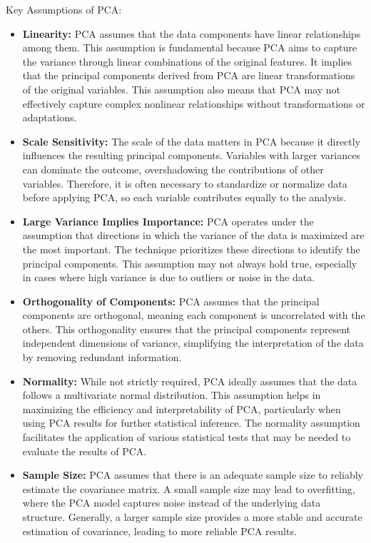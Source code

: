 \documentclass[sigconf]{acmart}
\begin{document}
Key Assumptions of PCA:

\begin{itemize}
    \item \textbf{Linearity:} PCA assumes that the data components have linear relationships among them. This assumption is fundamental because PCA aims to capture the variance through linear combinations of the original features. It implies that the principal components derived from PCA are linear transformations of the original variables. This assumption also means that PCA may not effectively capture complex nonlinear relationships without transformations or adaptations.
    
    \item \textbf{Scale Sensitivity:} The scale of the data matters in PCA because it directly influences the resulting principal components. Variables with larger variances can dominate the outcome, overshadowing the contributions of other variables. Therefore, it is often necessary to standardize or normalize data before applying PCA, so each variable contributes equally to the analysis.
    
    \item \textbf{Large Variance Implies Importance:} PCA operates under the assumption that directions in which the variance of the data is maximized are the most important. The technique prioritizes these directions to identify the principal components. This assumption may not always hold true, especially in cases where high variance is due to outliers or noise in the data.
    
    \item \textbf{Orthogonality of Components:} PCA assumes that the principal components are orthogonal, meaning each component is uncorrelated with the others. This orthogonality ensures that the principal components represent independent dimensions of variance, simplifying the interpretation of the data by removing redundant information.
    
    \item \textbf{Normality:} While not strictly required, PCA ideally assumes that the data follows a multivariate normal distribution. This assumption helps in maximizing the efficiency and interpretability of PCA, particularly when using PCA results for further statistical inference. The normality assumption facilitates the application of various statistical tests that may be needed to evaluate the results of PCA.
    
    \item \textbf{Sample Size:} PCA assumes that there is an adequate sample size to reliably estimate the covariance matrix. A small sample size may lead to overfitting, where the PCA model captures noise instead of the underlying data structure. Generally, a larger sample size provides a more stable and accurate estimation of covariance, leading to more reliable PCA results.
\end{itemize}
\end{document}
